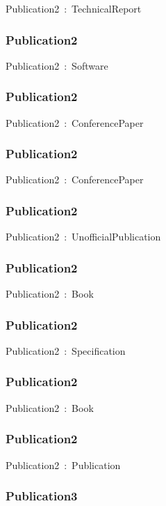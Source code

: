\documentclass{article}
\begin{document}
Publication2~:~TechnicalReport

\subsubsection*{Publication2}

Publication2~:~Software

\subsubsection*{Publication2}

Publication2~:~ConferencePaper

\subsubsection*{Publication2}

Publication2~:~ConferencePaper

\subsubsection*{Publication2}

Publication2~:~UnofficialPublication

\subsubsection*{Publication2}

Publication2~:~Book

\subsubsection*{Publication2}

Publication2~:~Specification

\subsubsection*{Publication2}

Publication2~:~Book

\subsubsection*{Publication2}

Publication2~:~Publication

\subsubsection*{Publication3}
\end{document}
